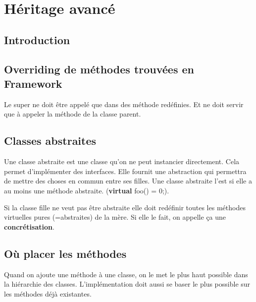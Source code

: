 \section{Héritage avancé}



\subsection{Introduction}



\subsection{Overriding de méthodes trouvées en Framework}
Le super ne doit être appelé que dans des méthode redéfinies. Et ne doit servir que à appeler la méthode de la classe parent.



\subsection{Classes abstraites}
Une classe abstraite est une classe qu’on ne peut instancier directement.
Cela permet d’implémenter des interfaces. Elle fournit une abstraction qui permettra de mettre des choses en commun entre ses filles.
Une classe abstraite l’est si elle a au moins une méthode abstraite. (\textbf{virtual} foo() = 0;).

Si la classe fille ne veut pas être abstraite elle doit redéfinir toutes les méthodes virtuelles pures (=abstraites) de la mère. Si elle le fait, on appelle ça une \textbf{concrétisation}.



\subsection{Où placer les méthodes}
Quand on ajoute une méthode à une classe, on le met le plus haut possible dans la hiérarchie des classes. L’implémentation doit aussi se baser le plus possible sur les méthodes déjà existantes.